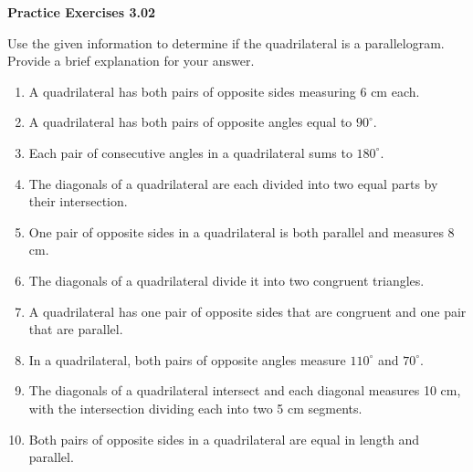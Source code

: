 \vspace{0.3ex}
\noindent\textbf{Practice Exercises 3.02}

\vspace{0.2ex}

\noindent Use the given information to determine if the quadrilateral is a parallelogram. Provide a brief explanation for your answer.

\begin{enumerate}[label=\color{blue}\arabic*.]
    \item A quadrilateral has both pairs of opposite sides measuring 6 cm each.
    \item A quadrilateral has both pairs of opposite angles equal to \(90^\circ\).
    \item Each pair of consecutive angles in a quadrilateral sums to \(180^\circ\).
    \item The diagonals of a quadrilateral are each divided into two equal parts by their intersection.
    \item One pair of opposite sides in a quadrilateral is both parallel and measures 8 cm.
    \item The diagonals of a quadrilateral divide it into two congruent triangles.
    \item A quadrilateral has one pair of opposite sides that are congruent and one pair that are parallel.
    \item In a quadrilateral, both pairs of opposite angles measure \(110^\circ\) and \(70^\circ\).
    \item The diagonals of a quadrilateral intersect and each diagonal measures 10 cm, with the intersection dividing each into two 5 cm segments.
    \item Both pairs of opposite sides in a quadrilateral are equal in length and parallel.
\end{enumerate}
